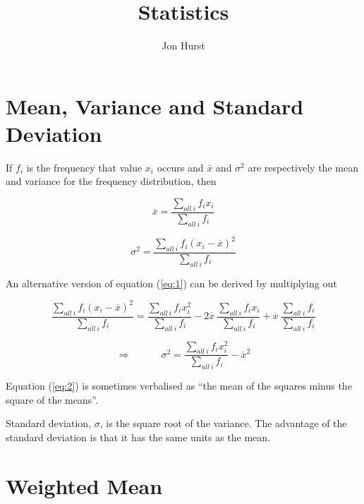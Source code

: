 \documentclass[a5paper]{article}
\title{Statistics}
\author{Jon Hurst}
\begin{document}
\maketitle

\section{Mean, Variance and Standard Deviation}

If $f_i$ is the frequency that value $x_i$ occurs and $\overline{x}$ and
$\sigma^2$ are respectively the mean and variance for the frequency
distribution, then

\begin{equation}
  \overline{x} = \frac{\sum\limits_{all\ i} f_i x_i}{\sum\limits_{all\ i} f_i}
\end{equation}

\begin{equation} \label{eq:1}
  \sigma^2 = \frac{\sum\limits_{all\ i} f_i (x_i - \overline{x})^2}{\sum\limits_{all\ i} f_i}
\end{equation}

\noindent An alternative version of equation (\ref{eq:1}) can be derived by
multiplying out

\begin{equation}
  \frac{\sum\limits_{all\ i} f_i (x_i - \overline{x})^2}{\sum\limits_{all\ i} f_i} =
  \frac{\sum\limits_{all\ i} f_i x_i^2}{\sum\limits_{all\ i} f_i}
  -2\overline{x}\ \frac{\sum\limits_{all\ i} f_i x_i}{\sum\limits_{all\ i} f_i}
  + \overline{x}\ \frac{\sum\limits_{all\ i} f_i}{\sum\limits_{all\ i} f_i}
\end{equation}

\begin{equation} \label{eq:2}
  \Rightarrow\hspace{3em} \sigma^2 = \frac{\sum\limits_{all\ i} f_i x_i^2}{\sum\limits_{all\ i} f_i} -
  \overline{x}^2
\end{equation}

\noindent Equation (\ref{eq:2}) is sometimes verbalised as ``the mean of the squares
minus the square of the means''.

Standard deviation, $\sigma$, is the square root of the variance. The advantage
of the standard deviation is that it has the same units as the mean.

\section{Weighted Mean}
\end{document}
